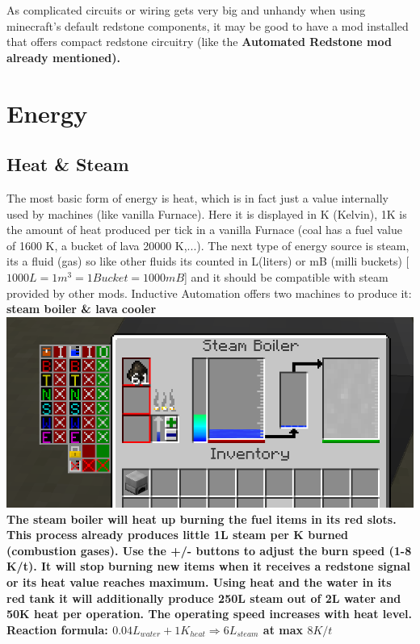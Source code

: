 \documentclass[11pt]{article} %
\begin{document}
As complicated circuits or wiring gets very big and unhandy when using minecraft's default redstone components, it may be good to have a mod installed that offers compact redstone circuitry (like the \bf Automated Redstone \rm mod already mentioned).

\section{Energy}
\subsection{Heat \& Steam}
The most basic form of energy is heat, which is in fact just a value internally used by machines (like vanilla Furnace). Here it is displayed in K (Kelvin), 1K is the amount of heat produced per tick in a vanilla Furnace (coal has a fuel value of 1600 K, a bucket of lava 20000 K,...). The next type of energy source is steam, its a fluid (gas) so like other fluids its counted in L(liters) or mB (milli buckets) [$1000L = 1m^3 = 1Bucket = 1000mB$] and it should be compatible with steam provided by other mods. Inductive Automation offers two machines to produce it: \bf steam boiler \rm \& \bf lava cooler \rm \\
\includegraphics[width = \textwidth]{steamBoiler}
The steam boiler will heat up burning the fuel items in its red slots. This process already produces little 1L steam per K burned (combustion gases). Use the +/- buttons to adjust the burn speed (1-8 K/t). It will stop burning new items when it receives a redstone signal or its heat value reaches maximum. Using heat and the water in its red tank it will additionally produce 250L steam out of 2L water and 50K heat per operation. The operating speed increases with heat level. \\
Reaction formula: $0.04L_{water} + 1K_{heat} \Longrightarrow 6L_{steam}$ at max $8K/t$ \\
\end{document}
